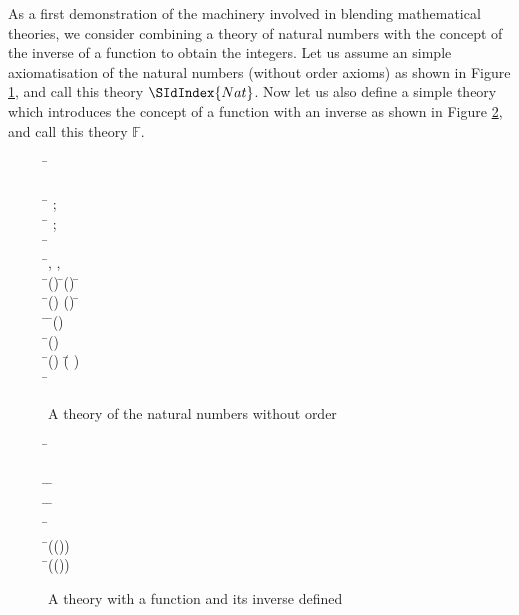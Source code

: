 As a first demonstration of the machinery involved in blending
mathematical theories, we consider combining a theory of natural
numbers with the concept of the inverse of a function to obtain the
integers. Let us assume an simple axiomatisation of the natural
numbers (without order axioms) as shown in Figure \ref{fig:nats}, and
call this theory $\SIdIndex{Nat}$. Now let us also define a simple theory
which introduces the concept of a function with an inverse as shown in
Figure \ref{fig:inv}, and call this theory $\mathbb{F}$. 
\begin{figure}[!ht]
\begin{hetcasl}
\SPEC \= \Ax{=}\\
\> \SORT {}\\
\> \OPS \= \Ax{:} ;\\
\>\>  \Ax{:} \= \Ax{\rightarrow} ;\\
\>\> \Ax{\_\_}\Ax{+}\Ax{\_\_} \Ax{:} \= \Ax{\times}  \Ax{\rightarrow} \\
\> \Ax{\forall} \=, ,  \Ax{:}  \\
\> \Ax{\bullet} \=() \Ax{=}  \Ax{\wedge} \=() \Ax{=}  \Ax{\Rightarrow} \= \Ax{=} \\
\> \Ax{\bullet} \=() \Ax{=} () \Ax{\Rightarrow} \= \Ax{=} \\
\> \Ax{\bullet} \=\Ax{\exists}  \Ax{:}  \Ax{\bullet} \=() \Ax{=} \\
\> \Ax{\bullet} \Ax{\neg} \=() \Ax{=} \\
\> \Ax{\bullet} \=() \Ax{+}  \Ax{=} (\= \Ax{+} )\\
\> \Ax{\bullet} \= \Ax{+}  \Ax{=} \\
\end{hetcasl}
\caption{A theory of the natural numbers without order}
\label{fig:nats}
\end{figure}

\begin{figure}[!ht]
\begin{hetcasl}
\SPEC \= \Ax{=}\\
\> \SORT {}\\
\> \OP \= \Ax{:} \= \Ax{\rightarrow} \\
\> \OP \= \Ax{:} \= \Ax{\rightarrow} \\
\> \Ax{\forall} \= \Ax{:}  \\
\> \Ax{\bullet} \=(()) \Ax{=} \\
\> \Ax{\bullet} \=(()) \Ax{=} \\
\end{hetcasl}
\caption{A theory with a function and its inverse defined}
\label{fig:inv}
\end{figure}



